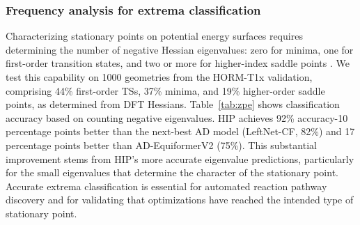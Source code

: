 \documentclass[pdflatex,sn-mathphys-num]{sn-jnl}%
\theoremstyle{thmstyleone}%
\theoremstyle{thmstyletwo}%
\theoremstyle{thmstylethree}%
\begin{document}
\subsubsection{Frequency analysis for extrema classification}
Characterizing stationary points on potential energy surfaces requires determining the number of negative Hessian eigenvalues: zero for minima, one for first-order transition states, and two or more for higher-index saddle points \cite{maronsson2012method}. We test this capability on 1000 geometries from the HORM-T1x validation, comprising 44\% first-order TSs, 37\% minima, and 19\% higher-order saddle points, as determined from DFT Hessians.
Table~\ref{tab:zpe} shows classification accuracy based on counting negative eigenvalues. HIP achieves 92\% accuracy-10 percentage points better than the next-best AD model (LeftNet-CF, 82\%) and 17 percentage points better than AD-EquiformerV2 (75\%). This substantial improvement stems from HIP's more accurate eigenvalue predictions, particularly for the small eigenvalues that determine the character of the stationary point.
Accurate extrema classification is essential for automated reaction pathway discovery and for validating that optimizations have reached the intended type of stationary point.


\end{document}
